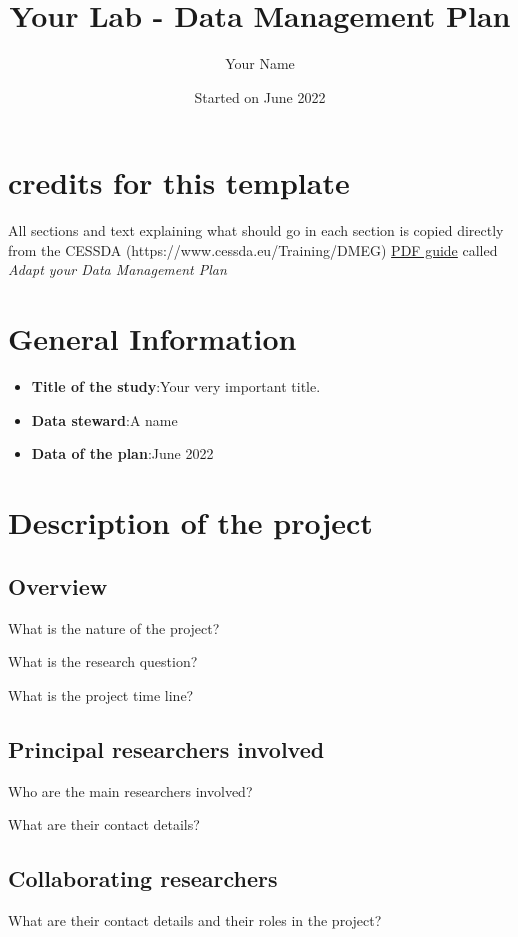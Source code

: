 \documentclass[11pt,a4paper]{article}
\author{Your Name}
\title{Your Lab - Data Management Plan}
\date{Started on June 2022}
\begin{document}
	\maketitle
	
	
	
	\section{credits for this template}
	All sections and text explaining what should go in each section is copied directly from the CESSDA (https://www.cessda.eu/Training/DMEG) \href{URL}{PDF guide} called \textit{Adapt your Data Management Plan}
		

	\section[general info]{General Information}
	
	\begin{itemize}
		\item\textbf{Title of the study}:\tab Your very important title.
		\item\textbf{Data steward}:\tab A name
		\item\textbf{Data of the plan}:\tab June 2022
	\end{itemize}

	\section{Description of the project}
	\subsection{Overview}
	What is the nature of the project?
	
	What is the research question?
	
	What is the project time line?
	\subsection{Principal researchers involved}
	Who are the main researchers involved?
	
	What are their contact details?
	\subsection{Collaborating researchers}
	What are their contact details and their roles in the project?
	
\end{document}
